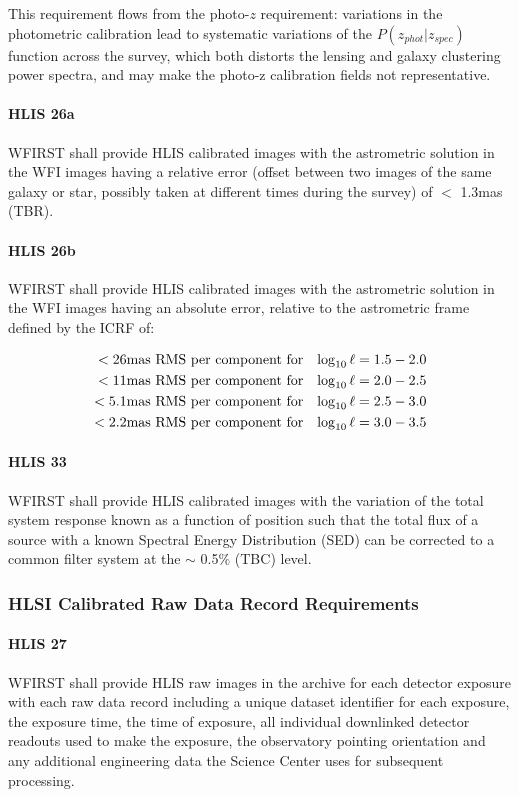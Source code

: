 This requirement flows from the photo-$z$ requirement: variations in the
photometric calibration lead to systematic variations of the $P(z_{phot}|z_{spec})$
function across the survey, which both distorts the lensing and galaxy
clustering power spectra, and may make the photo-z calibration fields not
representative.

\paragraph{HLIS 26a} WFIRST shall provide HLIS calibrated images with the astrometric
solution in the WFI images having a relative error (offset between two images of
the same galaxy or star, possibly taken at different times during the survey) of $<$
1.3mas (TBR).

\paragraph{HLIS 26b} WFIRST shall provide HLIS calibrated images with the astrometric
solution in the WFI images having an absolute error, relative to the astrometric
frame defined by the ICRF of:

\begin{eqnarray}
<26  & \rm{mas\ RMS\ per\ component\ for} & \log_{10}\ell = 1.5 - 2.0\\
<11  & \rm{mas\ RMS\ per\ component\ for} & \log_{10}\ell = 2.0 - 2.5\\
<5.1 & \rm{mas\ RMS\ per\ component\ for} & \log_{10}\ell = 2.5 - 3.0\\
<2.2 & \rm{mas\ RMS\ per\ component\ for} & \log_{10}\ell = 3.0 - 3.5
\end{eqnarray}

\paragraph{HLIS 33} WFIRST shall provide HLIS calibrated images with the
variation of the total system response known as a function of position such that
the total flux of a source with a known Spectral Energy Distribution (SED) can
be corrected to a common filter system at the $\sim$ 0.5\% (TBC) level.

\subsubsection{HLSI Calibrated Raw Data Record Requirements}

\paragraph{HLIS 27} WFIRST shall provide HLIS raw images in the archive for each
detector exposure with each raw data record including a unique dataset
identifier for each exposure, the exposure time, the time of exposure, all
individual downlinked detector readouts used to make the exposure, the
observatory pointing orientation and any additional engineering data the Science
Center uses for subsequent processing.

